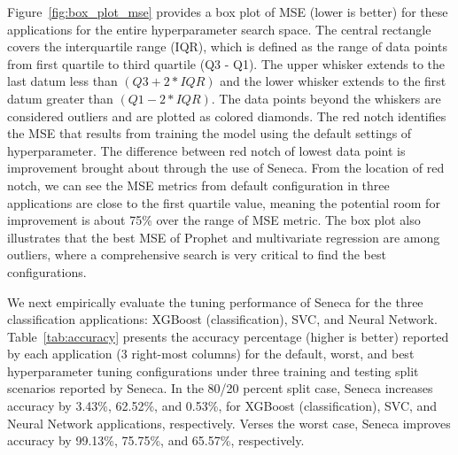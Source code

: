 Figure~\ref{fig:box_plot_mse} provides a box plot of MSE (lower is better)
for these applications 
for the entire hyperparameter 
search space. The central rectangle covers the interquartile range (IQR), 
which is defined as the range of data 
points from first quartile to third quartile (Q3 - Q1). 
The upper whisker extends to the last datum less 
than \texttt{$(Q3 + 2 * IQR)$} and the lower whisker extends to the first datum greater 
than \texttt{$(Q1 - 2 * IQR)$}. The data points beyond the whiskers are considered outliers 
and are plotted as colored diamonds. The red notch identifies the MSE that results from training 
the model using the default settings of hyperparameter. The difference between red notch of lowest data 
point is improvement brought about through the use of Seneca. From the location of red notch, we can see the MSE metrics from default configuration in three applications are close to the first quartile value, meaning the potential room for improvement is about 75\% over the range of MSE metric. The box plot also illustrates that the best MSE of Prophet and multivariate regression are among outliers, where a comprehensive search is very critical to find the best configurations. 

We next empirically evaluate the tuning performance of Seneca for the three
classification applications: XGBoost (classification), SVC, and Neural Network.
Table~\ref{tab:accuracy} presents the accuracy percentage (higher is better) 
reported by each application (3 right-most columns) 
for the default, worst, and best hyperparameter tuning configurations under three training and testing split scenarios reported by Seneca.  
In the 80/20 percent split case, Seneca increases accuracy by 3.43\%, 62.52\%, and 0.53\%, for XGBoost (classification), 
SVC, and Neural Network applications,
respectively.
Verses the worst case, Seneca improves accuracy by 99.13\%, 75.75\%, and 65.57\%, respectively.


